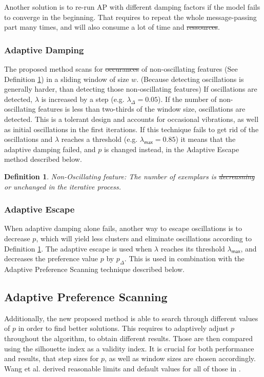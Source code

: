 \documentclass[11pt,a4paper]{article}
\newtheorem{definition}{Definition}
\providecommand{\DIFadd}[1]{{\protect\color{blue}\uwave{#1}}} %
\providecommand{\DIFdel}[1]{{\protect\color{red}\sout{#1}}}                      %
\providecommand{\DIFaddbegin}{} %
\providecommand{\DIFaddend}{} %
\providecommand{\DIFdelbegin}{} %
\providecommand{\DIFdelend}{} %
\newcommand{\DIFscaledelfig}{0.5}
\newlength{\DIFdelgraphicswidth} %
\newlength{\DIFdelgraphicsheight} %
\newcommand{\DIFaddincludegraphics}[2][]{{\color{blue}\fbox{\DIFOincludegraphics[#1]{#2}}}} %
\newcommand{\DIFdelincludegraphics}[2][]{%
\sbox{\DIFdelgraphicsbox}{\DIFOincludegraphics[#1]{#2}}%
\settoboxwidth{\DIFdelgraphicswidth}{\DIFdelgraphicsbox} %
\settoboxtotalheight{\DIFdelgraphicsheight}{\DIFdelgraphicsbox} %
\scalebox{\DIFscaledelfig}{%
\parbox[b]{\DIFdelgraphicswidth}{\usebox{\DIFdelgraphicsbox}\\[-\baselineskip] \rule{\DIFdelgraphicswidth}{0em}}\llap{\resizebox{\DIFdelgraphicswidth}{\DIFdelgraphicsheight}{%
\setlength{\unitlength}{\DIFdelgraphicswidth}%
\begin{picture}(1,1)%
\thicklines\linethickness{2pt} %
{\color[rgb]{1,0,0}\put(0,0){\framebox(1,1){}}}%
{\color[rgb]{1,0,0}\put(0,0){\line( 1,1){1}}}%
{\color[rgb]{1,0,0}\put(0,1){\line(1,-1){1}}}%
\end{picture}%
}\hspace*{3pt}}} %
} %
\DeclareRobustCommand{\DIFaddbegin}{\DIFOaddbegin \let\includegraphics\DIFaddincludegraphics} %
\DeclareRobustCommand{\DIFaddend}{\DIFOaddend \let\includegraphics\DIFOincludegraphics} %
\DeclareRobustCommand{\DIFdelbegin}{\DIFOdelbegin \let\includegraphics\DIFdelincludegraphics} %
\DeclareRobustCommand{\DIFdelend}{\DIFOaddend \let\includegraphics\DIFOincludegraphics} %
\begin{document}
Another solution is to re-run AP with different damping factors if the model fails to converge in the beginning. That requires to repeat the whole message-passing part many times, and will also consume a lot of time and \DIFdelbegin \DIFdel{ressources}\DIFdelend \DIFaddbegin \DIFadd{resources}\DIFaddend . \cite{wang2008adaptive}

\subsubsection{Adaptive Damping}
The proposed method scans for \DIFdelbegin \DIFdel{occurances }\DIFdelend \DIFaddbegin \DIFadd{occurrences }\DIFaddend of non-oscillating features (See Definition \ref{def:nonosc}) in a sliding window of size $w$. (Because detecting oscillations is generally harder, than detecting those non-oscillating features) If oscillations are detected, $\lambda$ is increased by a step (e.g. $\lambda_\Delta = 0.05$). If the number of non-oscillating features is less than two-thirds of the window size, oscillations are detected. This is a tolerant design and accounts for occasional vibrations, as well as initial oscillations in the first iterations. \cite{wang2008adaptive} If this technique fails to get rid of the oscillations and $\lambda$ reaches a threshold (e.g. $\lambda_{\mathsf{max}} = 0.85$) it means that the adaptive damping failed, and $p$ is changed instead, in the Adaptive Escape method described below.
\begin{definition}\label{def:nonosc}
	Non-Oscillating feature: The number of exemplars is \DIFdelbegin \DIFdel{decreasning }\DIFdelend \DIFaddbegin \DIFadd{decreasing }\DIFaddend or unchanged in the iterative process. \cite{wang2008adaptive}
\end{definition}
\subsubsection{Adaptive Escape}
When adaptive damping alone fails, another way to escape oscillations is to decrease $p$, which will yield less clusters and eliminate oscillations according to Definition \ref{def:nonosc}. The adaptive escape is used when $\lambda$ reaches its threshold $\lambda_{\mathsf{max}}$, and decreases the preference value $p$ by $p_{\Delta}$. \cite{wang2008adaptive} This is used in combination with the Adaptive Preference Scanning technique described below.
\subsection{Adaptive Preference Scanning}
Additionally, the new proposed method is able to search through different values of $p$ in order to find better solutions. This requires to adaptively adjust $p$ throughout the algorithm, to obtain different results. Those are then compared using the silhouette index \cite{ROUSSEEUW198753} as a validity index. It is crucial for both performance and results, that step sizes for $p$, as well as window sizes are chosen accordingly. Wang et al. derived reasonable limits and default values for all of those in \cite{wang2008adaptive}.
\pagebreak
\end{document}
